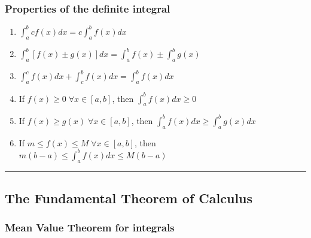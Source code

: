 \documentclass[
]{article}
\begin{document}
\hypertarget{properties-of-the-definite-integral}{%
\subsubsection{Properties of the definite
integral}\label{properties-of-the-definite-integral}}

\begin{enumerate}
\def\labelenumi{\arabic{enumi}.}
\item
  \(\displaystyle\int_a^b cf(x)dx = c\int_a^b f(x)dx\)
\item
  \(\displaystyle\int_a^b [f(x) \pm g(x)] dx = \int_a^b f(x) \pm \int_a^b g(x)\)
\item
  \(\displaystyle\int_a^c f(x)dx + \int_c^b f(x)dx = \int_a^b f(x)dx\)
\item
  If \(f(x)\geq0 \;\forall x \in[a,b]\), then
  \(\displaystyle\int_a^b f(x)dx \geq 0\)
\item
  If \(f(x) \geq g(x)\;\forall x\in[a,b]\), then
  \(\displaystyle\int_a^b f(x)dx \geq \int_a^b g(x)dx\)
\item
  If \(m \leq f(x) \leq M \;\forall x\in[a,b]\), then
  \(\displaystyle m(b-a) \leq \int_a^b f(x)dx \leq M(b-a)\)
\end{enumerate}

\begin{center}\rule{0.5\linewidth}{0.5pt}\end{center}

\hypertarget{the-fundamental-theorem-of-calculus}{%
\subsection{The Fundamental Theorem of
Calculus}\label{the-fundamental-theorem-of-calculus}}

\hypertarget{mean-value-theorem-for-integrals}{%
\subsubsection{Mean Value Theorem for
integrals}\label{mean-value-theorem-for-integrals}}
\end{document}
